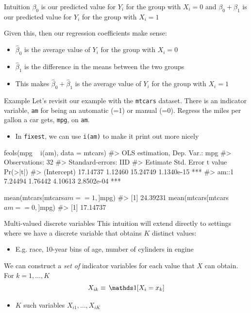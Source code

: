 \documentclass[aspectratio=169,t,11pt,table]{beamer}
\begin{document}
\begin{frame}{Intuition}
  $\beta_0$ is our predicted value for $Y_i$ for the group with $X_i = 0$ and $\beta_0 + \beta_1$ is our predicted value for $Y_i$ for the group with $X_i = 1$ 

  \bigskip
  Given this, then our regression coefficients make sense:
  \begin{itemize}
    \item $\hat{\beta}_0$ is the average value of $Y_i$ for the group with $X_i = 0$
    
    \item $\hat{\beta}_1$ is the difference in the means between the two groups
    
    \item This makes $\hat{\beta}_0 + \hat{\beta}_1$ is the average value of $Y_i$ for the group with $X_i = 1$
  \end{itemize}
\end{frame}

\begin{frame}{Example}
  Let's revisit our example with the \texttt{mtcars} dataset. There is an indicator variable, \texttt{am} for being an automatic (=1) or manual (=0). 
  Regress the miles per gallon a car gets, \texttt{mpg}, on \texttt{am}.

  \begin{itemize}
    \item In \texttt{fixest}, we can use \texttt{i(am)} to make it print out more nicely
  \end{itemize}
\end{frame}

\begin{frame}[fragile]{}
  \begin{codeblock}
feols(mpg ~ i(am), data = mtcars)
#> OLS estimation, Dep. Var.: mpg
#> Observations: 32
#> Standard-errors: IID 
#>             Estimate Std. Error  t value   Pr(>|t|)    
#> (Intercept) 17.14737    1.12460 15.24749 1.1340e-15 ***
#> am::1        7.24494    1.76442  4.10613 2.8502e-04 ***

mean(mtcars[mtcars$am == 1, ]$mpg)
#> [1] 24.39231
mean(mtcars[mtcars$am == 0, ]$mpg)
#> [1] 17.14737
  \end{codeblock}
\end{frame}

\begin{frame}{Multi-valued discrete variables}
  This intuition will extend directly to settings where we have a discrete variable that obtains $K$ distinct values:
  \begin{itemize}
    \item E.g. race, 10-year bins of age, number of cylinders in engine
  \end{itemize}

  \pause
  \bigskip
  We can construct a \emph{set of} indicator variables for each value that $X$ can obtain. For $k = 1, \dots, K$
  $$
    X_{ik} \equiv \one{X_i = x_k}
  $$
  \begin{itemize}
    \item $K$ such variables $X_{i1}, \dots, X_{iK}$
  \end{itemize}
\end{frame}
\end{document}
